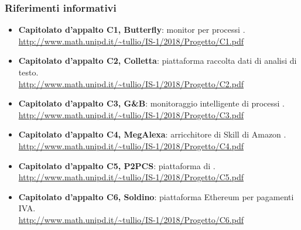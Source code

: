         \subsubsection{Riferimenti informativi}
            \begin{itemize}
                \item \textbf{Capitolato d'appalto C1, Butterfly}:
                    monitor per processi . \\
                    \url{http://www.math.unipd.it/~tullio/IS-1/2018/Progetto/C1.pdf}
                \item \textbf{Capitolato d'appalto C2, Colletta}:
                    piattaforma raccolta dati di analisi di testo. \\
                    \url{http://www.math.unipd.it/~tullio/IS-1/2018/Progetto/C2.pdf}
                \item \textbf{Capitolato d'appalto C3, G\&B}:
                    monitoraggio intelligente di processi . \\
                    \url{http://www.math.unipd.it/~tullio/IS-1/2018/Progetto/C3.pdf}
                \item \textbf{Capitolato d'appalto C4, MegAlexa}:
                    arricchitore di Skill di Amazon . \\
                    \url{http://www.math.unipd.it/~tullio/IS-1/2018/Progetto/C4.pdf}
                \item \textbf{Capitolato d'appalto C5, P2PCS}:
                    piattaforma di  . \\
                    \url{http://www.math.unipd.it/~tullio/IS-1/2018/Progetto/C5.pdf}
                \item \textbf{Capitolato d'appalto C6, Soldino}:
                    piattaforma Ethereum per pagamenti IVA. \\
                    \url{http://www.math.unipd.it/~tullio/IS-1/2018/Progetto/C6.pdf}
            \end{itemize}
